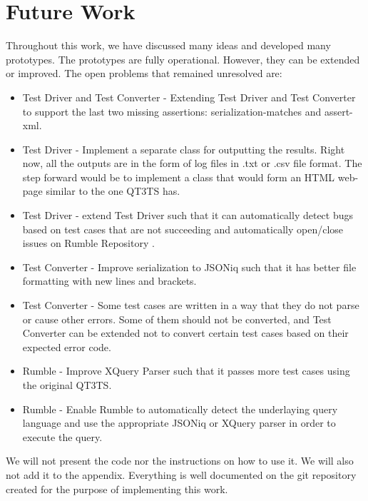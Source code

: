 \section{Future Work}
Throughout this work, we have discussed many ideas and developed many prototypes. The prototypes are fully operational. However, they can be extended or improved. The open problems that remained unresolved are:
\begin{itemize}
	\item Test Driver and Test Converter - Extending Test Driver and Test Converter to support the last two missing assertions: serialization-matches and assert-xml.
	\item Test Driver - Implement a separate class for outputting the results. Right now, all the outputs are in the form of log files in .txt or .csv file format. The step forward would be to implement a class that would form an HTML web-page similar to the one QT3TS has.
	\item Test Driver - extend Test Driver such that it can automatically detect bugs based on test cases that are not succeeding and automatically open/close issues on Rumble Repository \cite{RumbleRepository}.
	\item Test Converter - Improve serialization to JSONiq such that it has better file formatting with new lines and brackets.
	\item Test Converter - Some test cases are written in a way that they do not parse or cause other errors. Some of them should not be converted, and Test Converter can be extended not to convert certain test cases based on their expected error code.
	\item Rumble - Improve XQuery Parser such that it passes more test cases using the original QT3TS.
	\item Rumble - Enable Rumble to automatically detect the underlaying query language and use the appropriate JSONiq or XQuery parser in order to execute the query. 
\end{itemize}

We will not present the code nor the instructions on how to use it. We will also not add it to the appendix. Everything is well documented on the git repository \cite{StevanRepo} created for the purpose of implementing this work.